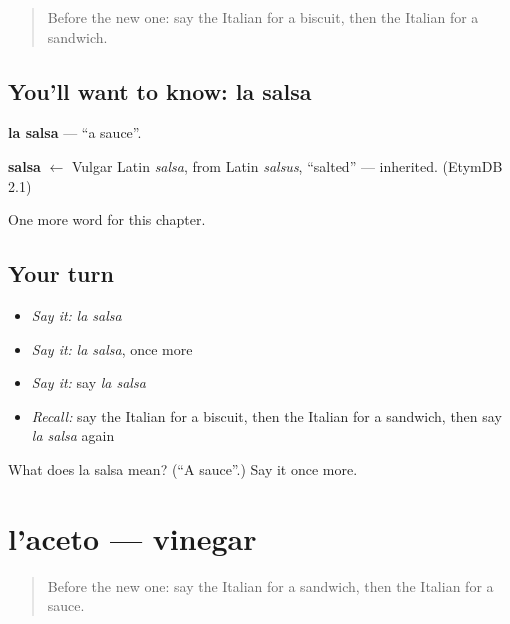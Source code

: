\label{lesson:IT-C108-salsa}



\begin{quote}
Before the new one: say the Italian for a biscuit, then the Italian for a sandwich.
\end{quote}

\subsection*{You'll want to know: la salsa}
\textbf{la salsa} — \textquotedblleft{}a sauce\textquotedblright{}.

\begin{cousinweb}
\textbf{salsa} $\leftarrow$ Vulgar Latin \emph{salsa}, from Latin \emph{salsus}, \textquotedblleft{}salted\textquotedblright{} — inherited. (EtymDB 2.1)
\end{cousinweb}

\begin{grammarlens}[title={What you've built}]
One more word for this chapter.
\end{grammarlens}

\subsection*{Your turn}
\begin{itemize}
\raggedright
  \item \emph{Say it:} \emph{la salsa}
  \item \emph{Say it:} \emph{la salsa}, once more
  \item \emph{Say it:} say \emph{la salsa}
  \item \emph{Recall:} say the Italian for a biscuit, then the Italian for a sandwich, then say \emph{la salsa} again
\end{itemize}

\begin{tcolorbox}[breakable,colback=teal!4,colframe=teal!35!black,title={Before you move on}]
What does la salsa mean? (\textquotedblleft{}A sauce\textquotedblright{}.) Say it once more.
\end{tcolorbox}
\section[l'aceto]{l'aceto — vinegar}

\label{lesson:IT-C108-aceto}



\begin{quote}
Before the new one: say the Italian for a sandwich, then the Italian for a sauce.
\end{quote}

